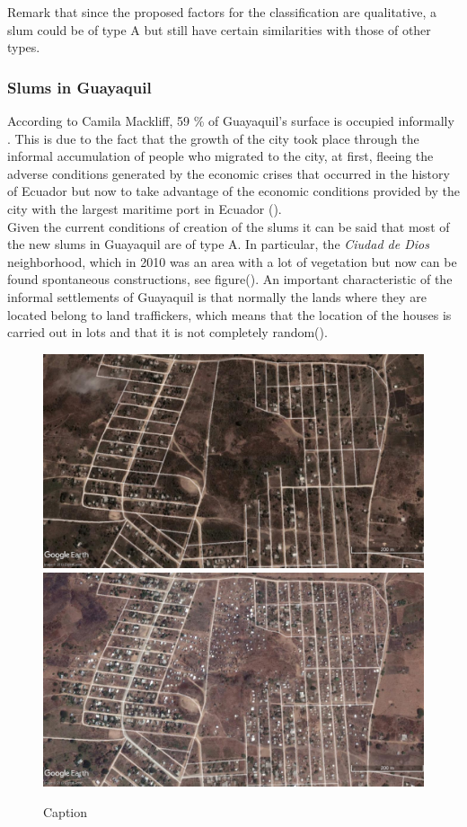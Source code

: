 \documentclass[10pt]{article}
\begin{document}
Remark that since the proposed factors for the classification are qualitative, a slum could be of type A but still have certain similarities with those of other types.

\subsubsection{Slums in Guayaquil}

According to Camila Mackliff, 59 \% of Guayaquil's surface is occupied informally \cite{cam_mac}. This is due to the fact that the growth of the city took place through the informal accumulation of people who migrated to the city, at first, fleeing the adverse conditions generated by the economic crises that occurred in the history of Ecuador but now to take advantage of the economic conditions provided by the city with the largest maritime port in Ecuador ().\\

Given the current conditions of creation of the slums it can be said that most of the new slums in Guayaquil are of type A. In particular, the \emph{Ciudad de Dios} neighborhood, which in 2010 was an area with a lot of vegetation but now can be found spontaneous constructions, see figure(). An important characteristic of the informal settlements of Guayaquil is that normally the lands where they are located belong to land traffickers, which means that the location of the houses is carried out in lots and that it is not completely random().

\begin{figure}[h]
    \centering
    \includegraphics[scale = 0.22]{images/C_Dios_2015.jpg}\hfill    \includegraphics[scale = 0.22]{images/C_Dios_2018.jpg}
    \caption{Caption}
    \label{fig:my_label}
\end{figure}
\end{document}

